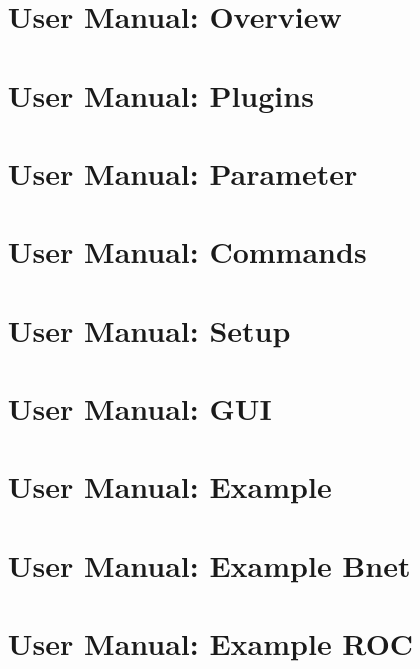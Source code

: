 
\chapter{\dabc~ User Manual: Overview}
 \cleardoublepage
\chapter{\dabc~ User Manual: Plugins}
 \cleardoublepage
\chapter{\dabc~ User Manual: Parameter}
 \cleardoublepage
\chapter{\dabc~ User Manual: Commands}
 \cleardoublepage
\chapter{\dabc~ User Manual: Setup}
 \cleardoublepage
\chapter{\dabc~ User Manual: GUI}
 \cleardoublepage
\chapter{\dabc~ User Manual: Example \mbs}
 \cleardoublepage
\chapter{\dabc~ User Manual: Example Bnet}
 \cleardoublepage
\chapter{\dabc~ User Manual: Example ROC}
 \cleardoublepage

